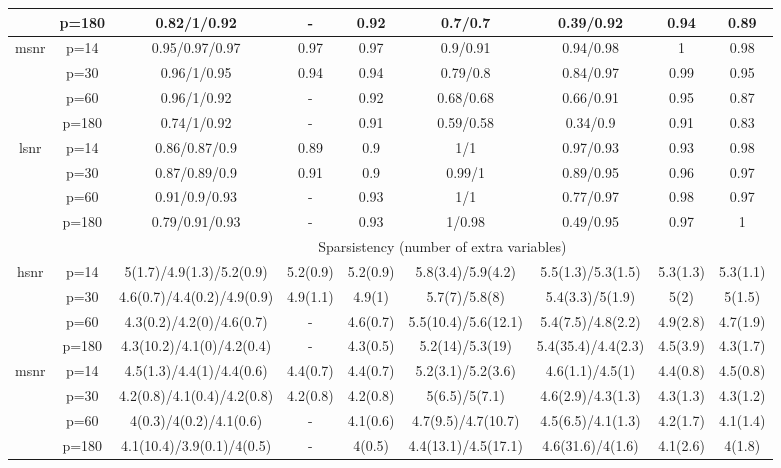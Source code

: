 \begin{table}[ht]
{\begin{tabular}{|c|c|ccccccc|}
   & p=180 & 0.82/1/0.92 & - & 0.92 & 0.7/0.7 & 0.39/0.92 & 0.94 & 0.89 \\ 
  \midrule\multirow{4}[2]{*}{msnr} & p=14 & 0.95/0.97/0.97 & 0.97 & 0.97 & 0.9/0.91 & 0.94/0.98 & 1 & 0.98 \\ 
   & p=30 & 0.96/1/0.95 & 0.94 & 0.94 & 0.79/0.8 & 0.84/0.97 & 0.99 & 0.95 \\ 
   & p=60 & 0.96/1/0.92 & - & 0.92 & 0.68/0.68 & 0.66/0.91 & 0.95 & 0.87 \\ 
   & p=180 & 0.74/1/0.92 & - & 0.91 & 0.59/0.58 & 0.34/0.9 & 0.91 & 0.83 \\ 
  \midrule\multirow{4}[2]{*}{lsnr} & p=14 & 0.86/0.87/0.9 & 0.89 & 0.9 & 1/1 & 0.97/0.93 & 0.93 & 0.98 \\ 
   & p=30 & 0.87/0.89/0.9 & 0.91 & 0.9 & 0.99/1 & 0.89/0.95 & 0.96 & 0.97 \\ 
   & p=60 & 0.91/0.9/0.93 & - & 0.93 & 1/1 & 0.77/0.97 & 0.98 & 0.97 \\ 
   & p=180 & 0.79/0.91/0.93 & - & 0.93 & 1/0.98 & 0.49/0.95 & 0.97 & 1 \\ 
   \midrule 
 \multicolumn{1}{|c}{} &       & \multicolumn{7}{c|}{Sparsistency (number of extra variables)} \\
\midrule\multirow{4}[2]{*}{hsnr} & p=14 & 5(1.7)/4.9(1.3)/5.2(0.9) & 5.2(0.9) & 5.2(0.9) & 5.8(3.4)/5.9(4.2) & 5.5(1.3)/5.3(1.5) & 5.3(1.3) & 5.3(1.1) \\ 
   & p=30 & 4.6(0.7)/4.4(0.2)/4.9(0.9) & 4.9(1.1) & 4.9(1) & 5.7(7)/5.8(8) & 5.4(3.3)/5(1.9) & 5(2) & 5(1.5) \\ 
   & p=60 & 4.3(0.2)/4.2(0)/4.6(0.7) & - & 4.6(0.7) & 5.5(10.4)/5.6(12.1) & 5.4(7.5)/4.8(2.2) & 4.9(2.8) & 4.7(1.9) \\ 
   & p=180 & 4.3(10.2)/4.1(0)/4.2(0.4) & - & 4.3(0.5) & 5.2(14)/5.3(19) & 5.4(35.4)/4.4(2.3) & 4.5(3.9) & 4.3(1.7) \\ 
  \midrule\multirow{4}[2]{*}{msnr} & p=14 & 4.5(1.3)/4.4(1)/4.4(0.6) & 4.4(0.7) & 4.4(0.7) & 5.2(3.1)/5.2(3.6) & 4.6(1.1)/4.5(1) & 4.4(0.8) & 4.5(0.8) \\ 
   & p=30 & 4.2(0.8)/4.1(0.4)/4.2(0.8) & 4.2(0.8) & 4.2(0.8) & 5(6.5)/5(7.1) & 4.6(2.9)/4.3(1.3) & 4.3(1.3) & 4.3(1.2) \\ 
   & p=60 & 4(0.3)/4(0.2)/4.1(0.6) & - & 4.1(0.6) & 4.7(9.5)/4.7(10.7) & 4.5(6.5)/4.1(1.3) & 4.2(1.7) & 4.1(1.4) \\ 
   & p=180 & 4.1(10.4)/3.9(0.1)/4(0.5) & - & 4(0.5) & 4.4(13.1)/4.5(17.1) & 4.6(31.6)/4(1.6) & 4.1(2.6) & 4(1.8) \\ 

\end{tabular}}
\end{table}
